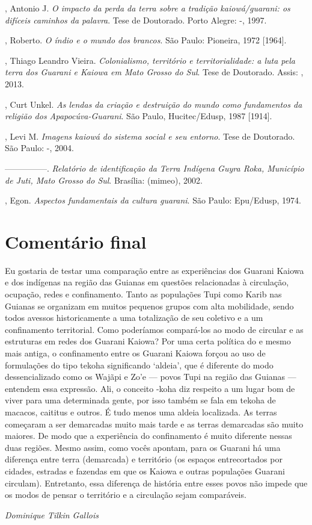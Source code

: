 {{\begin{Parskip}
, Antonio J. \emph{O impacto da perda da terra sobre a tradição
kaiowá/guarani: os difíceis caminhos da palavra}. Tese de Doutorado.
Porto Alegre: -, 1997.

  , Roberto. \emph{O índio e o mundo dos brancos}. São Paulo:
Pioneira, 1972 [1964].

, Thiago Leandro Vieira. \emph{Colonialismo, território e
territorialidade: a luta pela terra dos Guarani e Kaiowa em Mato Grosso
do Sul}. Tese de Doutorado. Assis: , 2013.

, Curt Unkel. \emph{As lendas da criação e destruição do mundo como
fundamentos da religião dos Apapocúva-Guarani}. São Paulo,
Hucitec/Edusp, 1987 [1914].

, Levi M. \emph{Imagens kaiowá do sistema social e seu entorno}. Tese de
Doutorado. São Paulo: -, 2004.

—————. \emph{Relatório de identificação da Terra Indígena Guyra Roka,
Município de Juti, Mato Grosso do Sul}. Brasília:  (mimeo), 2002.

, Egon. \emph{Aspectos fundamentais da cultura guarani}. São Paulo:
Epu/Edusp, 1974.
\end{Parskip}

\section{Comentário final}
Eu gostaria de testar uma comparação entre as experiências dos Guarani
Kaiowa e dos indígenas na região das Guianas em questões relacionadas à
circulação, ocupação, redes e confinamento. Tanto as populações Tupi
como Karib nas Guianas se organizam em muitos pequenos grupos com alta
mobilidade, sendo todos avessos historicamente a uma totalização de seu
coletivo e a um confinamento territorial. Como poderíamos compará-los
ao modo de circular e as estruturas em redes dos Guarani Kaiowa? Por
uma certa política do  e mesmo mais antiga, o confinamento entre os
Guarani Kaiowa forçou ao uso de formulações do tipo tekoha significando
‘aldeia’, que é diferente do modo dessencializado como os Wajãpi e Zo’e
--- povos Tupi na região das Guianas --- entendem essa expressão. Ali, o
conceito -koha diz respeito a um lugar bom de viver para uma
determinada gente, por isso também se fala em tekoha de macacos,
caititus e outros. É tudo menos uma aldeia localizada. As terras
começaram a ser demarcadas muito mais tarde e as terras demarcadas são
muito maiores. De modo que a experiência do confinamento é muito
diferente nessas duas regiões. Mesmo assim, como vocês apontam, para os
Guarani há uma diferença entre terra (demarcada) e território (os
espaços entrecortados por cidades, estradas e fazendas em que os Kaiowa
e outras populações Guarani circulam). Entretanto, essa diferença de
história entre esses povos não impede que os modos de pensar o
território e a circulação sejam comparáveis. 
\medskip
\begin{flushright}
\emph{Dominique Tilkin Gallois}
\end{flushright}

}}
